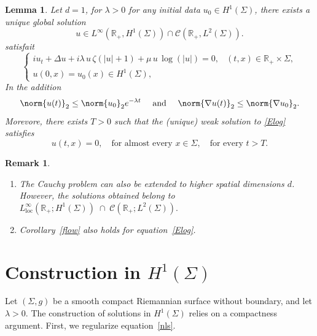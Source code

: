 \documentclass[10pt]{article}
\newtheorem{lemma}[theorem]{Lemma}
\newtheorem{remark}[theorem]{Remark}
\begin{document}
\begin{lemma}\label{coro}
        Let $d=1$, for $\lambda>0$ 
for any initial data $u_0 \in H^1(\Sigma)$, there exists a unique global solution
\[
u \in L^{\infty}(\mathbb{R}_+,H^1(\Sigma))\cap \mathcal{C}(\mathbb{R}_+,L^2(\Sigma)).
\]
satisfait \begin{equation}\tag{logNLS-$\zeta$}\label{Elog}
\begin{cases}
i u_t + \Delta u + i\lambda\, u\,\zeta(|u|+1) + \mu\, u\,\log(|u|) = 0, & (t,x)\in \mathbb{R}_+ \times \Sigma,\\[0.3em]
u(0,x) = u_0(x)\in H^1(\Sigma),
\end{cases}
\end{equation}
In the addition $$\norm{u(t)}_2\leq \norm{u_0}_2e^{-\lambda t} \quad \text{ and }\quad \norm{\nabla u(t)}_2\leq \norm{\nabla u_0}_2.$$
Morevore, there exists $T > 0$ such that the (unique) weak
solution to \eqref{Elog} satisfies
\[
u(t,x) = 0, \quad \text{for almost every } x \in \Sigma, \quad \text{for every } t > T.
\]

\end{lemma}

\begin{remark}
\begin{enumerate}
    \item
    The Cauchy problem can also be extended to higher spatial dimensions $ d $.
    However, the solutions obtained belong to
    $
    L^\infty_{\mathrm{loc}}(\mathbb{R}_+; H^1(\Sigma))
    \;\cap\;
    \mathcal{C}(\mathbb{R}_+; L^2(\Sigma)).
    $

    \item
    Corollary~\ref{flow} also holds for equation~\eqref{Elog}.
\end{enumerate}
\end{remark}


\section{Construction in \texorpdfstring{$H^1(\Sigma)$}{H1(Sigma)}}
Let $ (\Sigma, g) $ be a smooth compact Riemannian surface without boundary, and let $ \lambda > 0 $.
The construction of solutions in $ H^1(\Sigma) $ relies on a compactness argument.
First, we regularize equation~\eqref{nls}.
\end{document}
